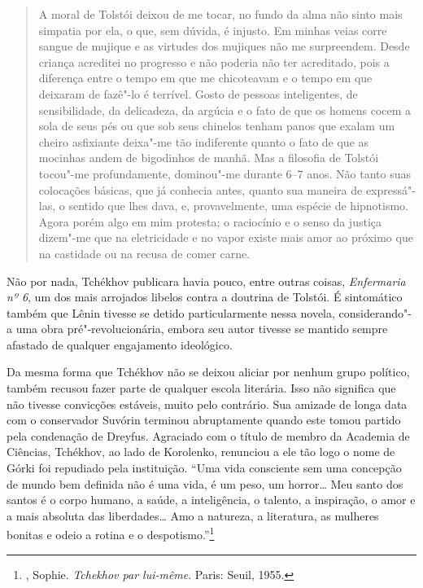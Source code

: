 \begin{quotation}
A moral de Tolstói deixou de me tocar, no fundo da alma não sinto
mais simpatia por ela, o que, sem dúvida, é injusto. Em minhas
veias corre sangue de mujique e as virtudes dos mujiques não me
surpreendem. Desde criança acreditei no progresso e não poderia
não ter acreditado, pois a diferença entre o tempo em que me
chicoteavam e o tempo em que deixaram de fazê"-lo é terrível.
Gosto de pessoas inteligentes, de sensibilidade, da delicadeza,
da argúcia e o fato de que os homens cocem a sola de seus pés ou
que sob seus chinelos tenham panos que exalam um cheiro asfixiante
deixa"-me tão indiferente quanto o fato de que as mocinhas andem
de bigodinhos de manhã. Mas a filosofia de Tolstói tocou"-me
profundamente, dominou"-me durante 6--7 anos. Não tanto suas
colocações básicas, que já conhecia antes, quanto sua maneira de
expressá"-las, o sentido que lhes dava, e, provavelmente, uma
espécie de hipnotismo. Agora porém algo em mim protesta; o
raciocínio e o senso da justiça dizem"-me que na eletricidade e
no vapor existe mais amor ao próximo que na castidade ou na recusa
de comer carne. 
\end{quotation}

Não por nada, Tchékhov publicara havia pouco, entre outras coisas,
\emph{Enfermaria nº 6}, um dos mais arrojados libelos contra a
doutrina de Tolstói. É sintomático também que Lênin tivesse se
detido particularmente nessa novela, considerando"-a uma obra
pré"-revolucionária, embora seu autor tivesse se mantido sempre
afastado de qualquer engajamento ideológico.

Da mesma forma que Tchékhov não se deixou aliciar por nenhum grupo
político, também recusou fazer parte de qualquer escola literária.
Isso não significa que não tivesse convicções estáveis, muito pelo
contrário. Sua amizade de longa data com o conservador Suvórin terminou
abruptamente quando este tomou partido pela condenação de Dreyfus.
Agraciado com o título de membro da Academia de Ciências, Tchékhov, ao lado de Korolenko, renunciou a ele tão logo o nome de Górki foi
repudiado pela instituição. ``Uma vida consciente sem uma concepção
de mundo bem definida não é uma vida, é um peso, um horror\ldots{}
Meu santo dos santos é o corpo humano, a saúde, a inteligência, o
talento, a inspiração, o amor e a mais absoluta das liberdades\ldots{}
Amo a natureza, a literatura, as mulheres bonitas e odeio a rotina e
o despotismo.''\footnote{, Sophie. \emph{Tchekhov par lui-même}. Paris: Seuil, 1955.}

